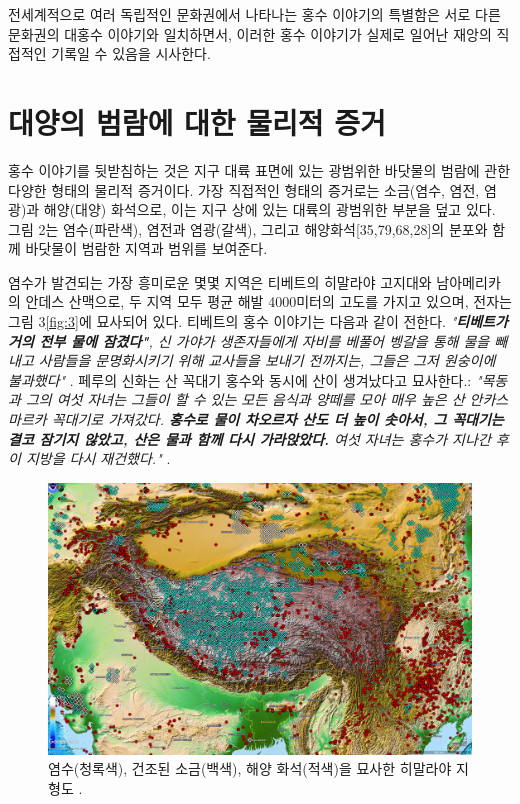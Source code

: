 \documentclass[10pt,twocolumn,letterpaper]{article}
\begin{document}
전세계적으로 여러 독립적인 문화권에서 나타나는 홍수 이야기의 특별함은  서로 다른 문화권의 대홍수 이야기와 일치하면서, 이러한 홍수 이야기가 실제로 일어난 재앙의 직접적인 기록일 수 있음을 시사한다.

\section{대양의 범람에 대한 물리적 증거}

홍수 이야기를 뒷받침하는 것은 지구 대륙 표면에 있는 광범위한 바닷물의 범람에 관한 다양한 형태의 물리적 증거이다. 가장 직접적인 형태의 증거로는  소금(염수, 염전, 염광)과 해양(대양) 화석으로, 이는 지구 상에 있는 대륙의 광범위한 부분을 덮고 있다. 그림 2는 염수(파란색), 염전과 염광(갈색), 그리고 해양화석[35,79,68,28]의 분포와 함께 바닷물이 범람한 지역과 범위를 보여준다.

염수가 발견되는 가장 흥미로운 몇몇 지역은  티베트의 히말라야 고지대와 남아메리카의 안데스 산맥으로, 두 지역 모두 평균 해발 4000미터의 고도를 가지고 있으며, 전자는 그림 3\ref{fig:3}에 묘사되어 있다. 티베트의 홍수 이야기는 다음과 같이 전한다. \textit{"\textbf{티베트가 거의 전부 물에 잠겼다"}, 신 가야가 생존자들에게 자비를 베풀어 벵갈을 통해 물을 빼내고  사람들을 문명화시키기 위해 교사들을 보내기 전까지는, 그들은 그저 원숭이에 불과했다"} \cite{3}. 페루의 신화는 산 꼭대기 홍수와 동시에 산이 생겨났다고 묘사한다.: \textit{"목동과 그의 여섯 자녀는 그들이 할 수 있는 모든 음식과 양떼를 모아 매우 높은 산 안카스마르카 꼭대기로 가져갔다. \textbf{홍수로 물이 차오르자  산도 더 높이 솟아서, 그 꼭대기는 결코 잠기지 않았고, 산은 물과 함께 다시 가라앉았다.} 여섯 자녀는 홍수가 지나간 후  이 지방을 다시 재건했다."} \cite{3}.

\begin{figure}[t]
\begin{center}
   \includegraphics[width=1\linewidth]{tibet.jpg}
\end{center}
   \caption{염수(청록색), 건조된 소금(백색), 해양 화석(적색)을 묘사한 히말라야 지형도 \cite{15,16,86,87}.}
\label{fig:3}
\label{fig:onecol}
\end{figure}
\end{document}
